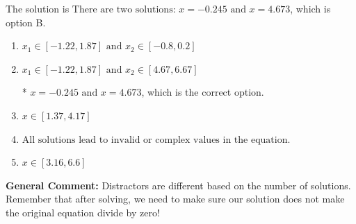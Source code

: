 \documentclass{extbook}[14pt]
\begin{document}
\begin{enumerate}
{The solution is \( \text{There are two solutions: } x = -0.245 \text{ and } x = 4.673 \), which is option B.\begin{enumerate}[label=\Alph*.]
\item \( x_1 \in [-1.22, 1.87] \text{ and } x_2 \in [-0.8,0.2] \)


\item \( x_1 \in [-1.22, 1.87] \text{ and } x_2 \in [4.67,6.67] \)

* $x = -0.245 \text{ and } x = 4.673$, which is the correct option.
\item \( x \in [1.37,4.17] \)


\item \( \text{All solutions lead to invalid or complex values in the equation.} \)


\item \( x \in [3.16,6.6] \)


\end{enumerate}

\textbf{General Comment:} Distractors are different based on the number of solutions. Remember that after solving, we need to make sure our solution does not make the original equation divide by zero!
}
\end{enumerate}
\end{document}
